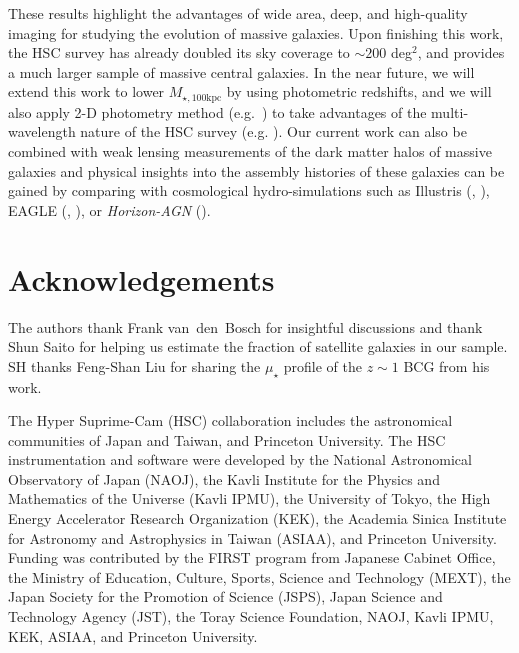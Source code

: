 \documentclass[a4paper,fleqn,usenatbib]{mnras}
\def\mtot{{$M_{\star,100\mathrm{kpc}}$}}
\def\mden{{$\mu_{\star}$}}
\begin{document}
    These results highlight the advantages of wide area, deep, and high-quality imaging 
    for studying the evolution of massive galaxies. 
    Upon finishing this work, the HSC survey has already doubled its sky coverage to 
    ${\sim} 200$ deg$^2$, and provides a much larger sample of massive central galaxies. 
    In the near future, we will extend this work to lower \mtot{} by using photometric 
    redshifts, and we will also apply 2-D photometry method (e.g.\ \citealt{Huang2013a}) 
    to take advantages of the multi-wavelength nature of the HSC survey 
    (e.g. \citealt{Huang2016}). 
    Our current work can also be combined with weak lensing measurements of the dark 
    matter halos of massive galaxies and physical insights into the assembly histories 
    of these galaxies can be gained by comparing with cosmological hydro-simulations 
    such as Illustris (\citealt{Vogelsberger2014}, \citealt{Genel2014}), 
    EAGLE (\citealt{Schaye2015}, \citealt{Crain2015}), or \textit{Horizon-AGN} 
    (\citealt{Dubois2014}).

  
\section*{Acknowledgements}

  The authors thank Frank van~den~Bosch for insightful discussions and thank 
  Shun Saito for helping us estimate the fraction of satellite galaxies in our sample.
  SH thanks Feng-Shan Liu for sharing the \mden{} profile of the $z\sim1$ BCG from 
  his work.

  The Hyper Suprime-Cam (HSC) collaboration includes the astronomical communities of 
  Japan and Taiwan, and Princeton University.  The HSC instrumentation and software were
  developed by the National Astronomical Observatory of Japan (NAOJ), the Kavli Institute
  for the Physics and Mathematics of the Universe (Kavli IPMU), the University of Tokyo,
  the High Energy Accelerator Research Organization (KEK), the Academia Sinica Institute
  for Astronomy and Astrophysics in Taiwan (ASIAA), and Princeton University.  
  Funding was contributed by the FIRST program from Japanese Cabinet Office, the Ministry 
  of Education, Culture, Sports, Science and Technology (MEXT), the Japan Society for 
  the Promotion of Science (JSPS), Japan Science and Technology Agency (JST), the
  Toray Science Foundation, NAOJ, Kavli IPMU, KEK, ASIAA, and Princeton University.
   
\end{document}
